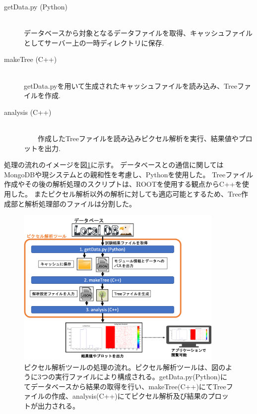 \begin{description}
  \item[getData.py (Python)]\mbox{}\\ 
    データベースから対象となるデータファイルを取得、キャッシュファイルとしてサーバー上の一時ディレクトリに保存.
  \item[makeTree (C++)]\mbox{}\\ 
    getData.pyを用いて生成されたキャッシュファイルを読み込み、Treeファイルを作成.
  \item[analysis (C++)]\mbox{}\\ 
　　作成したTreeファイルを読み込みピクセル解析を実行、結果値やプロットを出力.
\end{description}

処理の流れのイメージを図\ref{analysis_tool_flow}に示す。
データベースとの通信に関してはMongoDBや現システムとの親和性を考慮し、Pythonを使用した。
Treeファイル作成やその後の解析処理のスクリプトは、ROOTを使用する観点からC++を使用した。
またピクセル解析以外の解析に対しても適応可能とするため、Tree作成部と解析処理部のファイルは分割した。

\begin{figure}[bpt]\centering
\includegraphics[width=10cm]{./analysis_tool_flow.png}
\caption[ピクセル解析ツールの処理の流れ]{ピクセル解析ツールの処理の流れ。ピクセル解析ツールは、図のように3つの実行ファイルにより構成される。getData.py(Python)にてデータベースから結果の取得を行い、makeTree(C++)にてTreeファイルの作成、analysis(C++)にてピクセル解析及び結果のプロットが出力される。}
\label{analysis_tool_flow}
\end{figure}

\clearpage
